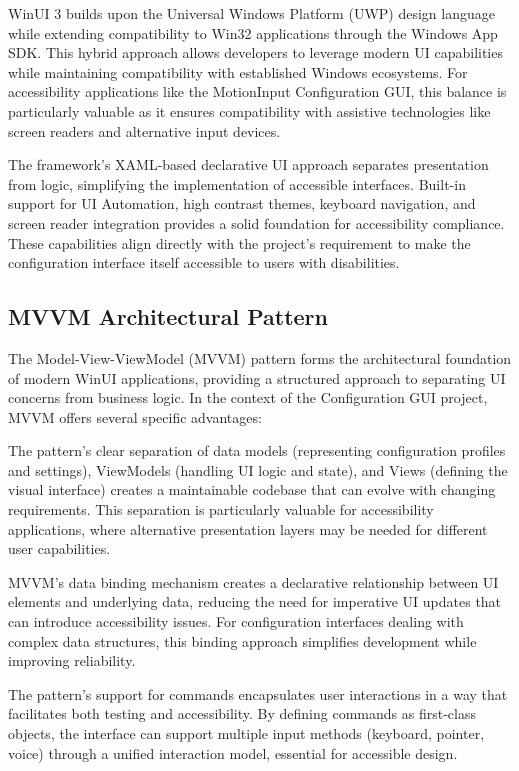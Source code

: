 WinUI 3 builds upon the Universal Windows Platform (UWP) design language while extending compatibility to Win32 applications through the Windows App SDK. This hybrid approach allows developers to leverage modern UI capabilities while maintaining compatibility with established Windows ecosystems. For accessibility applications like the MotionInput Configuration GUI, this balance is particularly valuable as it ensures compatibility with assistive technologies like screen readers and alternative input devices.

The framework's XAML-based declarative UI approach separates presentation from logic, simplifying the implementation of accessible interfaces. Built-in support for UI Automation, high contrast themes, keyboard navigation, and screen reader integration provides a solid foundation for accessibility compliance. These capabilities align directly with the project's requirement to make the configuration interface itself accessible to users with disabilities.

\subsection{MVVM Architectural Pattern}
The Model-View-ViewModel (MVVM) pattern forms the architectural foundation of modern WinUI applications, providing a structured approach to separating UI concerns from business logic. In the context of the Configuration GUI project, MVVM offers several specific advantages:

The pattern's clear separation of data models (representing configuration profiles and settings), ViewModels (handling UI logic and state), and Views (defining the visual interface) creates a maintainable codebase that can evolve with changing requirements. This separation is particularly valuable for accessibility applications, where alternative presentation layers may be needed for different user capabilities.

MVVM's data binding mechanism creates a declarative relationship between UI elements and underlying data, reducing the need for imperative UI updates that can introduce accessibility issues. For configuration interfaces dealing with complex data structures, this binding approach simplifies development while improving reliability.

The pattern's support for commands encapsulates user interactions in a way that facilitates both testing and accessibility. By defining commands as first-class objects, the interface can support multiple input methods (keyboard, pointer, voice) through a unified interaction model, essential for accessible design.


